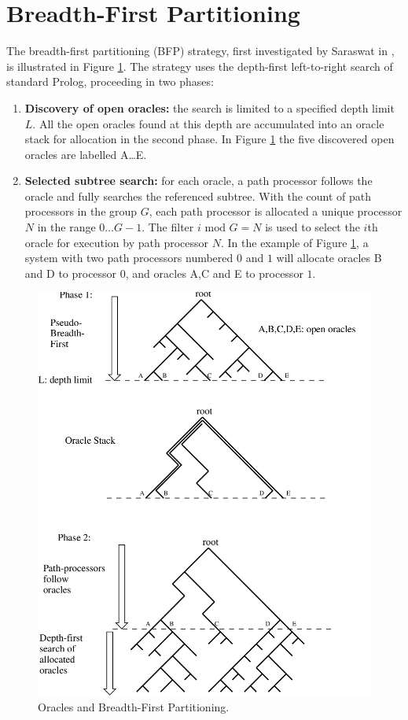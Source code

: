 \documentclass[a4paper,11pt,twoside]{article}
\begin{document}
\section{Breadth-First Partitioning} %
\label{bfp_section}

The breadth-first partitioning (BFP) strategy, first 
investigated by Saraswat in \cite{Sar95}, is illustrated in
Figure \ref{bfp}.  The strategy uses the depth-first left-to-right
search of standard Prolog, proceeding in two phases:
\begin{enumerate}
\item{\textbf{Discovery of open oracles:} the search is limited to a
  specified depth limit $L$.  All the open oracles found at this depth
  are accumulated into an oracle stack for allocation in the second
  phase.  In Figure \ref{bfp} the five discovered open oracles are
  labelled A\ldots E.}
\item{\textbf{Selected subtree search:} for each oracle, a path
  processor follows the oracle and fully searches the referenced
  subtree.  With the count of path processors in the group $G$,
  each path processor is allocated a unique processor $N$ in the
  range $0\ldots G-1$.  The filter $i \mbox{ mod } G = N$ is used
  to select the $i$th oracle for execution by path processor $N$.
  In the example of Figure \ref{bfp},  a system with two path processors
  numbered $0$ and $1$ will allocate oracles B and D to processor $0$,
  and oracles A,C and E to processor $1$.}
\end{enumerate}

\begin{figure}
  \includegraphics[width=\linewidth]{bfp.png}
  \caption{Oracles and Breadth-First Partitioning.}
  \label{bfp}
\end{figure}
\end{document}
